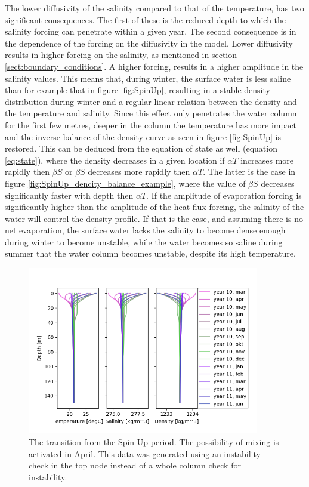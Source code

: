 \documentclass[twocolumn]{article}
\begin{document}
The lower diffusivity of the salinity compared to that of the temperature, has two significant consequences. The first of these is the reduced depth to which the salinity forcing can penetrate within a given year. The second consequence is in the dependence of the forcing on the diffusivity in the model. Lower diffusivity results in higher forcing on the salinity, as mentioned in section \ref{sect:boundary_conditions}. A higher forcing, results in a higher amplitude in the salinity values. This means that, during winter, the surface water is less saline than for example that in figure \ref{fig:SpinUp}, resulting in a stable density distribution during winter and a regular linear relation between the density and the temperature and salinity. Since this effect only penetrates the water column for the first few metres, deeper in the column the temperature has more impact and the inverse balance of the density curve as seen in figure \ref{fig:SpinUp} is restored. This can be deduced from the equation of state as well (equation \ref{eq:state}), where the density decreases in a given location if $\alpha T$ increases more rapidly then $\beta S$ or $\beta S$ decreases more rapidly then $\alpha T$. The latter is the case in figure \ref{fig:SpinUp_dencity_balance_example}, where the value of $\beta S$ decreases significantly faster with depth then $\alpha T$. If the amplitude of evaporation forcing is significantly higher than the amplitude of the heat flux forcing, the salinity of the water will control the density profile. If that is the case, and assuming there is no net evaporation, the surface water lacks the salinity to become dense enough during winter to become unstable, while the water becomes so saline during summer that the water column becomes unstable, despite its high temperature.
 
\begin{figure}
\centering
\includegraphics[width=0.9\textwidth,keepaspectratio]{Transition.png}
\caption{The transition from the Spin-Up period. The possibility of mixing is activated in April. This data was generated using an instability check in the top node instead of a whole column check for instability.}
\label{fig:Transition}
\end{figure}
 
\end{document}
